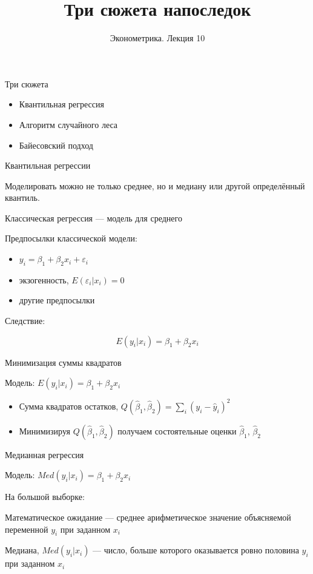 \documentclass[ignorenonframetext,]{beamer}
\author[Эконометрика. Лекция 10]{Эконометрика. Лекция 10}
\title{Три сюжета напоследок}
\date{}
\newcommand{\e}{\varepsilon}
\newcommand{\hy}{\hat{y}}
\newcommand{\hb}{\hat{\beta}}
\begin{document}
\frame{\titlepage}

\begin{frame}{Три сюжета}

\begin{itemize}
\item
  Квантильная регрессия
\item
  Алгоритм случайного леса
\item
  Байесовский подход
\end{itemize}

\end{frame}

\begin{frame}{Квантильная регрессии}

Моделировать можно не только среднее, но и медиану или другой
определённый квантиль.

\end{frame}

\begin{frame}{Классическая регрессия --- модель для среднего}

Предпосылки классической модели:

\begin{itemize}
\item
  \(y_i=\beta_1 + \beta_2 x_i + \e_i\)
\item
  экзогенность, \(E(\e_i | x_i)=0\)
\item
  другие предпосылки
\end{itemize}

Следствие:

\[
E(y_i|x_i)=\beta_1 + \beta_2 x_i
\]

\end{frame}

\begin{frame}{Минимизация суммы квадратов}

Модель: \(E(y_i|x_i)=\beta_1 + \beta_2 x_i\)

\begin{itemize}
\item
  Сумма квадратов остатков, \(Q(\hb_1,\hb_2)=\sum_i (y_i - \hy_i)^2\)
\item
  Минимизируя \(Q(\hb_1,\hb_2)\) получаем состоятельные оценки
  \(\hb_1\), \(\hb_2\)
\end{itemize}

\end{frame}

\begin{frame}{Медианная регрессия}

Модель: \(Med(y_i|x_i)=\beta_1 + \beta_2 x_i\)

На большой выборке:

Математическое ожидание --- среднее арифметическое значение объясняемой
переменной \(y_i\) при заданном \(x_i\)

Медиана, \(Med(y_i|x_i)\) --- число, больше которого оказывается ровно
половина \(y_i\) при заданном \(x_i\)

\end{frame}
\end{document}

